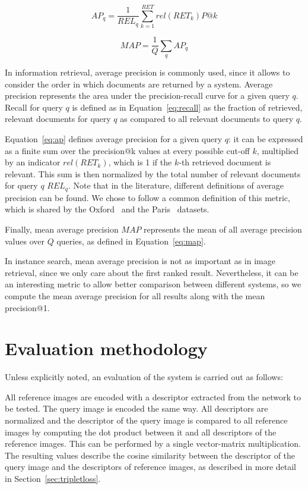 \begin{equation}\label{eq:ap}
AP_q = \frac{1}{REL_q} \sum_{k=1}^{RET} rel(RET_k)P@k
\end{equation}

\begin{equation}\label{eq:map}
MAP = \frac{1}{Q} \sum_q AP_q
\end{equation}

In information retrieval, average precision is commonly used, since it
allows to consider the order in which documents are returned by a system.
Average precision represents the area under the precision-recall curve
for a given query $q$. Recall for query $q$ is defined as in
Equation~\ref{eq:recall} as the fraction of retrieved, relevant documents
for query $q$ as compared to all relevant documents to query $q$.

Equation~\ref{eq:ap} defines average precision for a given query $q$:
it can be expressed as a finite sum
over the precision@k values at every possible cut-off $k$, multiplied by an
indicator $rel(RET_k)$, which is 1 if the $k$-th retrieved document is
relevant. This sum is then normalized by the total number of relevant
documents for query $q$ $REL_q$.
Note that in the literature, different definitions of average precision can
be found. We chose to follow a common definition of this metric, which
is shared by the Oxford~\cite{philbin_object_2007} and the
Paris~\cite{philbin_lost_2008} datasets.

Finally, mean average precision $MAP$ represents the mean of all average
precision values over $Q$ queries, as defined in Equation~\ref{eq:map}.

In instance search, mean average precision is not as important as in image retrieval,
since we only care about the first ranked result. Nevertheless, it can be an interesting
metric to allow better comparison between different systems, so we compute
the mean average precision for all results along with the mean precision@1.

\section{Evaluation methodology}\label{sec:evalmethod}
Unless explicitly noted, an evaluation of the system is carried out as
follows:

All reference images are encoded with a descriptor extracted from the
network to be tested. The query image is encoded the same way.
All descriptors are normalized and the descriptor of the query image
is compared to all reference images by computing the dot product between
it and all descriptors of the reference images. This can be performed
by a single vector-matrix multiplication. The resulting values describe
the cosine similarity between the descriptor of the query image
and the descriptors of reference images, as described in more detail
in Section~\ref{sec:tripletloss}.


